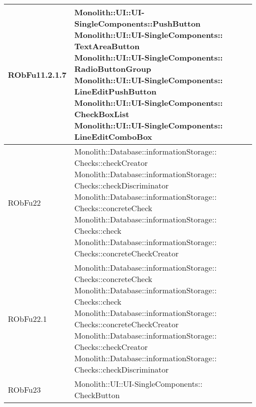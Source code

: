 \begin{center}
\begin{longtable}{|
*{1}{>{\centering\arraybackslash}m{2.5cm}|}
*{1}{>{\centering\arraybackslash}m{7.5cm}|}}
RObFu11.2.1.7 & \makecell[l]{Monolith::UI::UI-SingleComponents::PushButton
\\Monolith::UI::UI-SingleComponents:: \\ \hfill TextAreaButton
\\Monolith::UI::UI-SingleComponents:: \\ \hfill RadioButtonGroup
\\Monolith::UI::UI-SingleComponents:: \\ \hfill LineEditPushButton
\\Monolith::UI::UI-SingleComponents:: \\ \hfill CheckBoxList
\\Monolith::UI::UI-SingleComponents:: \\ \hfill LineEditComboBox
\\}\\\hline
RObFu22 & \makecell[l]{Monolith::Database::informationStorage:: \\ \hfill Checks::checkCreator
\\Monolith::Database::informationStorage:: \\ \hfill Checks::checkDiscriminator
\\Monolith::Database::informationStorage:: \\ \hfill Checks::concreteCheck
\\Monolith::Database::informationStorage:: \\ \hfill Checks::check
\\Monolith::Database::informationStorage:: \\ \hfill Checks::concreteCheckCreator
\\}\\\hline
RObFu22.1 & \makecell[l]{Monolith::Database::informationStorage:: \\ \hfill Checks::concreteCheck
\\Monolith::Database::informationStorage:: \\ \hfill Checks::check
\\Monolith::Database::informationStorage:: \\ \hfill Checks::concreteCheckCreator
\\Monolith::Database::informationStorage:: \\ \hfill Checks::checkCreator
\\Monolith::Database::informationStorage:: \\ \hfill Checks::checkDiscriminator
\\}\\\hline
RObFu23 & \makecell[l]{Monolith::UI::UI-SingleComponents:: \\ \hfill CheckButton
}
\end{longtable}
\end{center}
